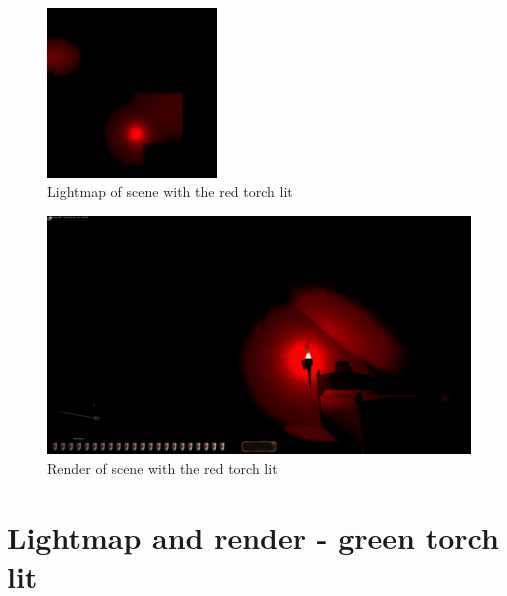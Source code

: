\begin{appendix}
\begin{figure}[htbp]
	\centering
		\includegraphics[width=0.40\textwidth]{img/PIX/r.png}
	\caption[Lightmap of scene with the red torch lit]{Lightmap of scene with the red torch lit}
	\label{fig:LightmapR}
\end{figure}
\begin{figure}[htbp]
	\centering
		\includegraphics[width=1.00\textwidth]{img/PIX/render_r.png}
	\caption[Render of scene with the red torch lit]{Render of scene with the red torch lit}
	\label{fig:RenderR}
\end{figure}

\clearpage
{}
\section{Lightmap and render - green torch lit} 



\end{appendix}
